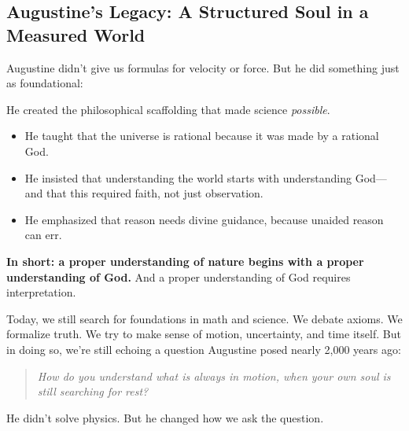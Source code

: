 \subsection{Augustine’s Legacy: A Structured Soul in a Measured World}

Augustine didn’t give us formulas for velocity or force. But he did something just as foundational:

He created the philosophical scaffolding that made science \textit{possible}.

\begin{itemize}
  \item He taught that the universe is rational because it was made by a rational God.
  \item He insisted that understanding the world starts with understanding God—and that this required faith, not just observation.
  \item He emphasized that reason needs divine guidance, because unaided reason can err.
\end{itemize}

\textbf{In short: a proper understanding of nature begins with a proper understanding of God.}  
And a proper understanding of God requires interpretation.

\medskip

Today, we still search for foundations in math and science. We debate axioms. We formalize truth. We try to make sense of motion, uncertainty, and time itself. But in doing so, we’re still echoing a question Augustine posed nearly 2,000 years ago:

\begin{quote}
\emph{How do you understand what is always in motion, when your own soul is still searching for rest?}
\end{quote}

He didn’t solve physics. But he changed how we ask the question.



